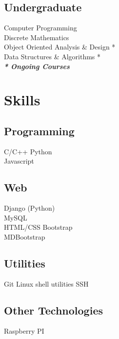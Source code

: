 \documentclass[]{deedy-resume-openfont}
\begin{document}
\begin{minipage}[t]{0.30\textwidth}

\subsection{Undergraduate}
Computer Programming \\
Discrete Mathematics \\
Object Oriented Analysis \& Design * \\
Data Structures \& Algorithms * \\
{\footnotesize \textit{\textbf{* Ongoing Courses}}}
\sectionsep


\section{Skills}
\subsection{Programming}
\textbullet{}   C/C++  \textbullet{} Python \\
\textbullet{} Javascript 
\sectionsep

\subsection{Web}
\textbullet{} Django (Python) \\ \textbullet{} MySQL \\ 
\textbullet{} HTML/CSS \textbullet{} Bootstrap \\ 
\textbullet{} MDBootstrap \\
\sectionsep

\subsection{Utilities}
 \textbullet{} Git \textbullet{} Linux shell utilities \textbullet{} SSH
\sectionsep
\subsection{Other Technologies}
 \textbullet{} Raspberry PI \\
\bigskip


\end{minipage}
\end{document}
